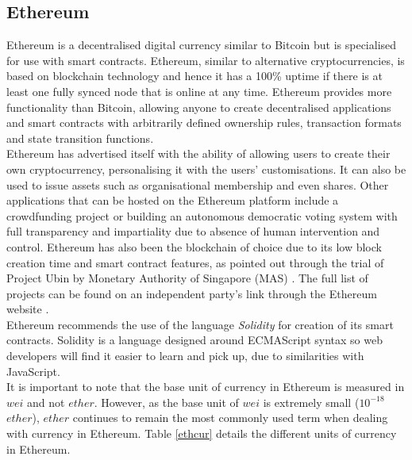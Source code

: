 \documentclass[a4paper,12pt]{article}
\begin{document}
{	\subsection{Ethereum}
	{\par \noindent Ethereum is a decentralised digital currency similar to Bitcoin but is specialised for use with smart contracts. Ethereum, similar to alternative cryptocurrencies, is based on blockchain technology and hence it has a 100\% uptime if there is at least one fully synced node that is online at any time. Ethereum provides more functionality than Bitcoin, allowing anyone to create decentralised applications and smart contracts with arbitrarily defined ownership rules, transaction formats and state transition functions.\\\newline
	Ethereum has advertised itself with the ability of allowing users to create their own cryptocurrency, personalising it with the users' customisations. It can also be used to issue assets such as organisational membership and even shares. Other applications that can be hosted on the Ethereum platform include a crowdfunding project or building an autonomous democratic voting system with full transparency and impartiality due to absence of human intervention and control. Ethereum has also been the blockchain of choice due to its low block creation time and smart contract features, as pointed out through the trial of Project Ubin by Monetary Authority of Singapore (MAS) \cite{ubinchain}. The full list of projects can be found on an independent party's link through the Ethereum website \cite{ethproj}. \\\newline
	Ethereum recommends the use of the language \textit{Solidity} for creation of its smart contracts. Solidity is a language designed around ECMAScript syntax so web developers will find it easier to learn and pick up, due to similarities with JavaScript.\\\newline
	It is important to note that the base unit of currency in Ethereum is measured in $wei$ and not $ether$. However, as the base unit of $wei$ is extremely small ($10^{-18}$ $ether$), $ether$ continues to remain the most commonly used term when dealing with currency in Ethereum. Table \ref{ethcur} details the different units of currency in Ethereum.
	\begin{table}[H]
		\centering


\end{table}}}
\end{document}
